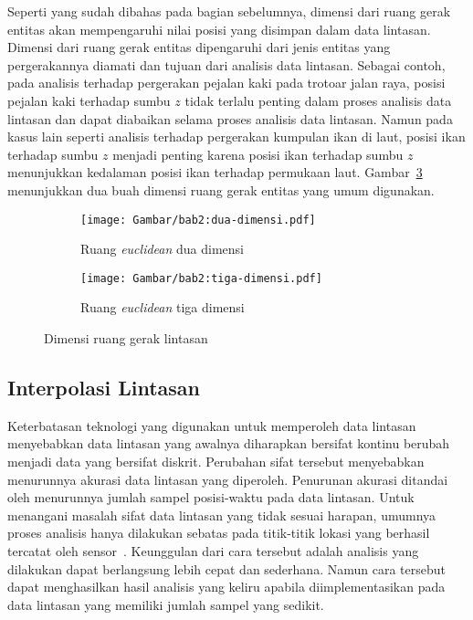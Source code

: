 Seperti yang sudah dibahas pada bagian sebelumnya, dimensi dari ruang gerak entitas akan mempengaruhi nilai posisi yang disimpan dalam data lintasan. Dimensi dari ruang gerak entitas dipengaruhi dari jenis entitas yang pergerakannya diamati dan tujuan dari analisis data lintasan. Sebagai contoh, pada analisis terhadap pergerakan pejalan kaki pada trotoar jalan raya, posisi pejalan kaki terhadap sumbu $z$ tidak terlalu penting dalam proses analisis data lintasan dan dapat diabaikan selama proses analisis data lintasan. Namun pada kasus lain seperti analisis terhadap pergerakan kumpulan ikan di laut, posisi ikan terhadap sumbu $z$ menjadi penting karena posisi ikan terhadap sumbu $z$ menunjukkan kedalaman posisi ikan terhadap permukaan laut. Gambar~\ref{bab2:ruang-gerak} menunjukkan dua buah dimensi ruang gerak entitas yang umum digunakan.

\iffalse

Pada skripsi ini, entitas yang diamati akan bergerak dalam ruang \textit{euclidean} dua dimensi yang disimbolkan sebagai $\mathbb{R}^2$\lionov{ini harusnya ada di batasan}.

\fi

\begin{figure}[b!]
    \centering
    \begin{subfigure}[h]{0.325\textwidth}
        \centering
        \texttt{[image: Gambar/bab2:dua-dimensi.pdf]}
        \caption{Ruang \textit{euclidean} dua dimensi}
        \label{bab2:dua-dimensi}
    \end{subfigure} \hspace{1.25cm}
    \begin{subfigure}[h]{0.325\textwidth}
        \centering
        \texttt{[image: Gambar/bab2:tiga-dimensi.pdf]}
        \caption{Ruang \textit{euclidean} tiga dimensi}
        \label{bab2:tiga-dimensi}
    \end{subfigure}
    \caption{Dimensi ruang gerak lintasan}
    \label{bab2:ruang-gerak}
\end{figure}

\subsection{Interpolasi Lintasan}
\label{subsec:interpolasi}

Keterbatasan teknologi yang digunakan untuk memperoleh data lintasan menyebabkan data lintasan yang awalnya diharapkan bersifat kontinu berubah menjadi data yang bersifat diskrit. Perubahan sifat tersebut menyebabkan menurunnya akurasi data lintasan yang diperoleh. Penurunan akurasi ditandai oleh menurunnya jumlah sampel posisi-waktu pada data lintasan. Untuk menangani masalah sifat data lintasan yang tidak sesuai harapan, umumnya proses analisis hanya dilakukan sebatas pada titik-titik lokasi yang berhasil tercatat oleh sensor~\cite{wiratma:trajectory}. Keunggulan dari cara tersebut adalah analisis yang dilakukan dapat berlangsung lebih cepat dan sederhana. Namun cara tersebut dapat menghasilkan hasil analisis yang keliru apabila diimplementasikan pada data lintasan yang memiliki jumlah sampel yang sedikit.

